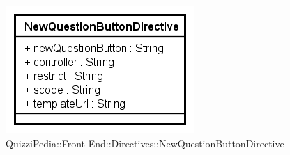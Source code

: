 \begin{figure}[ht]
	\centering
	\includegraphics[scale=0.80,keepaspectratio]{UML/Classi/Front-End/QuizziPedia_Front-end_Directives_NewQuestionButtonDirective.png}
	\caption{QuizziPedia::Front-End::Directives::NewQuestionButtonDirective}
\end{figure} 
\FloatBarrier

